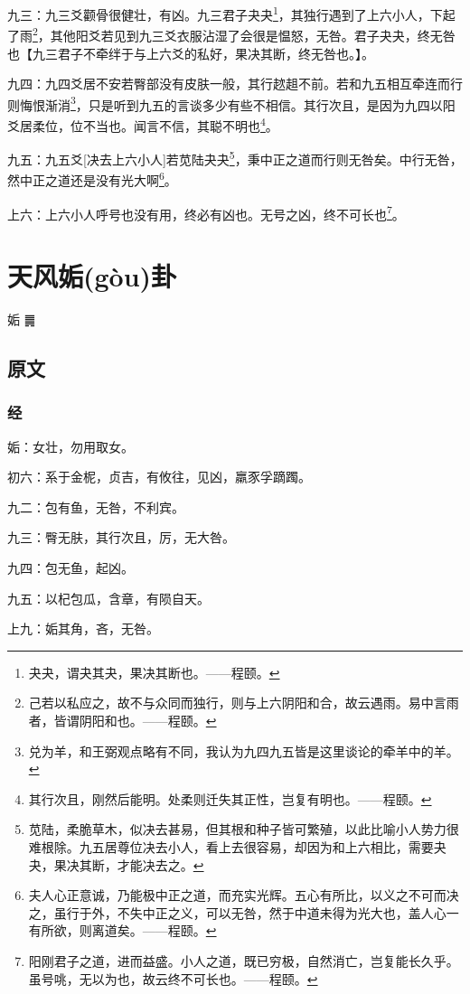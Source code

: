\documentclass[12pt,oneside]{book}
\begin{document}
九三：九三爻颧骨很健壮，有凶。九三君子夬夬\footnote{夬夬，谓夬其夬，果决其断也。——程颐。}，其独行遇到了上六小人，下起了雨\footnote{己若以私应之，故不与众同而独行，则与上六阴阳和合，故云遇雨。易中言雨者，皆谓阴阳和也。——程颐。}，其他阳爻若见到九三爻衣服沾湿了会很是愠怒，无咎。君子夬夬，终无咎也【九三君子不牵绊于与上六爻的私好，果决其断，终无咎也。】。

九四：九四爻居不安若臀部没有皮肤一般，其行趑趄不前。若和九五相互牵连而行则悔恨渐消\footnote{兑为羊，和王弼观点略有不同，我认为九四九五皆是这里谈论的牵羊中的羊。}，只是听到九五的言谈多少有些不相信。其行次且，是因为九四以阳爻居柔位，位不当也。闻言不信，其聪不明也\footnote{其行次且，刚然后能明。处柔则迁失其正性，岂复有明也。——程颐。}。

九五：九五爻[决去上六小人]若苋陆夬夬\footnote{苋陆，柔脆草木，似决去甚易，但其根和种子皆可繁殖，以此比喻小人势力很难根除。九五居尊位决去小人，看上去很容易，却因为和上六相比，需要夬夬，果决其断，才能决去之。}，秉中正之道而行则无咎矣。中行无咎，然中正之道还是没有光大啊\footnote{夫人心正意诚，乃能极中正之道，而充实光辉。五心有所比，以义之不可而决之，虽行于外，不失中正之义，可以无咎，然于中道未得为光大也，盖人心一有所欲，则离道矣。——程颐。}。

上六：上六小人呼号也没有用，终必有凶也。无号之凶，终不可长也\footnote{阳刚君子之道，进而益盛。小人之道，既已穷极，自然消亡，岂复能长久乎。虽号咷，无以为也，故云终不可长也。——程颐。}。



\chapter{天风姤(gòu)卦}
姤 {\Large ䷫}

\section{原文}

\subsection{经}
姤：女壮，勿用取女。

初六：系于金柅，贞吉，有攸往，见凶，羸豕孚蹢躅。

九二：包有鱼，无咎，不利宾。

九三：臀无肤，其行次且，厉，无大咎。

九四：包无鱼，起凶。

九五：以杞包瓜，含章，有陨自天。

上九：姤其角，吝，无咎。
\end{document}
